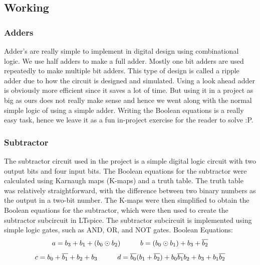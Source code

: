 \documentclass[a4paper,10pt]{article}
\begin{document}
\subsection{Working}

\subsubsection{Adders}
Adder’s are really simple to implement in digital design using combinational logic. We use half adders to make a full adder. Mostly one bit adders are used repeatedly to make multiple bit adders. This type of design is called a ripple adder due to how the circuit is designed and simulated. Using a look ahead adder is obviously more efficient since it saves a lot of time. But using it in a project as big as ours does not really make sense and hence we went along with the normal simple logic of using a simple adder. Writing the Boolean equations is a really easy task, hence we leave it as a fun in-project exercise for the reader to solve :P.
\subsubsection{Subtractor}
The subtractor circuit used in the project is a simple digital logic circuit with two output bits and four input bits. The Boolean equations for the subtractor were calculated using Karnaugh maps (K-maps) and a truth table. The truth table was relatively straightforward, with the difference between two binary numbers as the output in a two-bit number. The K-maps were then simplified to obtain the Boolean equations for the subtractor, which were then used to create the subtractor subcircuit in LTspice. The subtractor subcircuit is implemented using simple logic gates, such as AND, OR, and NOT gates.\newline\newline
Boolean Equations:\newline
\hspace*{2cm} \[a = b_3 + b_1 + (b_0 \odot b_2) \hspace*{1cm}  b = (b_0 \odot b_1) + b_3 + \overline{b_2}\]\newline
\hspace*{2cm} \[c = b_0 + \overline{b_1} + b_2 + b_3 \hspace*{1cm}  d = \overline{b_0}(b_1 + \overline{b_2}) + b_0 \overline{b_1} b_2 + b_3 + b_1 \overline{b_2}\]\newline
\end{document}
